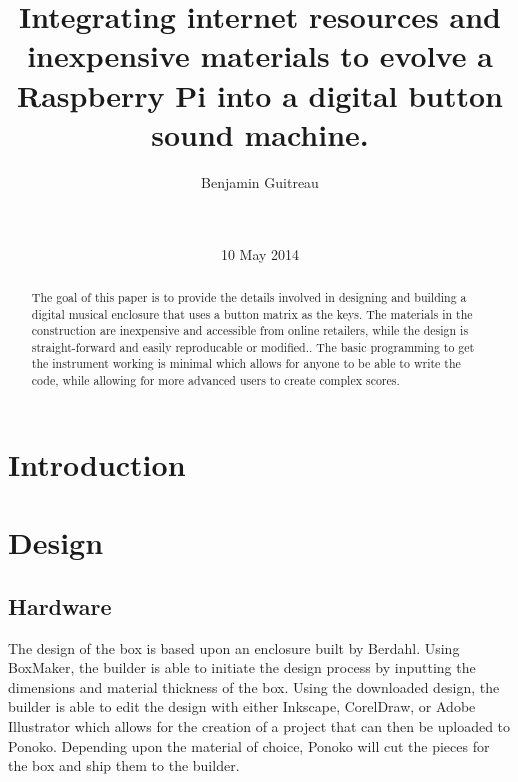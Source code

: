 \documentclass{nime-alternate}
\begin{document}

\title{Integrating internet resources and inexpensive materials to evolve a 
Raspberry Pi into a digital button sound machine. }


\author{
\alignauthor
Benjamin Guitreau\\
\\
\\
}

\date{10 May 2014}

\maketitle
\begin{abstract}
The goal of this paper is to provide the details involved in designing and building 
a digital musical enclosure that uses a button matrix as the keys. The materials 
in the construction are inexpensive and accessible from online retailers, while 
the design is straight-forward and easily reproducable or modified.. The basic 
programming to get the instrument working is minimal which allows for anyone to 
be able to write the code, while allowing for more advanced users to create complex 
scores. 
\end{abstract}


\section{Introduction}

\section{Design}

\subsection{Hardware}
The design of the box is based upon an enclosure built by Berdahl\cite{Berdahl:2014:Misc}. Using BoxMaker\cite{Bhargava:2013:Misc}, the builder is able to initiate the design process by inputting the dimensions and material thickness of the box. Using the downloaded design, the builder is able to edit the design with either Inkscape, CorelDraw, or Adobe Illustrator which allows for the creation of a project that can then be uploaded to Ponoko\cite{Ponoko}. Depending upon the material of choice, Ponoko will cut the pieces for the box and ship them to the builder.
\end{document}
